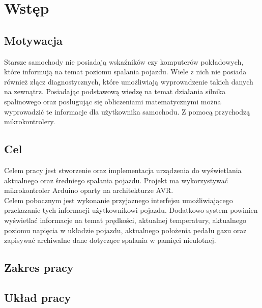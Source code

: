 \chapter{Wstęp}
\section{Motywacja}
Starsze samochody nie posiadają wskaźników czy komputerów pokładowych, które informują na temat poziomu spalania pojazdu. Wiele z nich nie posiada również złącz diagnostycznych, które umożliwiają wyprowadzenie takich danych na zewnątrz. Posiadając podstawową wiedzę na temat działania silnika spalinowego oraz posługując się obliczeniami matematycznymi można wyprowadzić te informacje dla użytkownika samochodu. Z pomocą przychodzą mikrokontrolery.
\section{Cel}
Celem pracy jest stworzenie oraz implementacja urządzenia do wyświetlania aktualnego oraz średniego spalania pojazdu. Projekt ma wykorzystywać mikrokontroler Arduino oparty na architekturze AVR.
\\Celem pobocznym jest wykonanie przyjaznego interfejsu umożliwiającego przekazanie tych informacji użytkownikowi pojazdu. Dodatkowo system powinien wyświetlać informacje na temat prędkości, aktualnej temperatury, aktualnego poziomu napięcia w układzie pojazdu, aktualnego położenia pedału gazu oraz zapisywać archiwalne dane dotyczące spalania w pamięci nieulotnej.
\section{Zakres pracy}

\section{Układ pracy}

